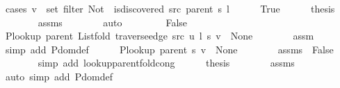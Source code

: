\begin{isabellebody}
\ {\isacharparenleft}{\kern0pt}cases\ {\isachardoublequoteopen}v\ {\isasymin}\ set\ {\isacharparenleft}{\kern0pt}filter\ {\isacharparenleft}{\kern0pt}Not\ {\isasymcirc}\ is{\isacharunderscore}{\kern0pt}discovered\ src\ {\isacharparenleft}{\kern0pt}parent\ s{\isacharparenright}{\kern0pt}{\isacharparenright}{\kern0pt}\ l{\isacharparenright}{\kern0pt}{\isachardoublequoteclose}{\isacharparenright}{\kern0pt}\isanewline
\ \ \ \ \isamarkupfalse%
\ True\isanewline
\ \ \ \ \isamarkupfalse%
\ {\isacharquery}{\kern0pt}thesis\isanewline
\ \ \ \ \ \ \isamarkupfalse%
\ assms{\isacharparenleft}{\kern0pt}{}{\isacharparenright}{\kern0pt}\isanewline
\ \ \ \ \ \ \isamarkupfalse%
\ auto\isanewline
\ \ \isamarkupfalse%
\isanewline
\ \ \ \ \isamarkupfalse%
\ False\isanewline
\ \ \ \ \isamarkupfalse%
\ {\isachardoublequoteopen}P{\isacharunderscore}{\kern0pt}lookup\ {\isacharparenleft}{\kern0pt}parent\ {\isacharparenleft}{\kern0pt}List{\isachardot}{\kern0pt}fold\ {\isacharparenleft}{\kern0pt}traverse{\isacharunderscore}{\kern0pt}edge\ src\ u{\isacharparenright}{\kern0pt}\ l\ s{\isacharparenright}{\kern0pt}{\isacharparenright}{\kern0pt}\ v\ {\isasymnoteq}\ None{\isachardoublequoteclose}\isanewline
\ \ \ \ \ \ \isamarkupfalse%
\ assm\isanewline
\ \ \ \ \ \ \isamarkupfalse%
\ {\isacharparenleft}{\kern0pt}simp\ add{\isacharcolon}{\kern0pt}\ P{\isachardot}{\kern0pt}dom{\isacharunderscore}{\kern0pt}def{\isacharparenright}{\kern0pt}\isanewline
\ \ \ \ \isamarkupfalse%
\ {\isachardoublequoteopen}P{\isacharunderscore}{\kern0pt}lookup\ {\isacharparenleft}{\kern0pt}parent\ s{\isacharparenright}{\kern0pt}\ v\ {\isasymnoteq}\ None{\isachardoublequoteclose}\isanewline
\ \ \ \ \ \ \isamarkupfalse%
\ assms{\isacharparenleft}{\kern0pt}{}{\isacharcomma}{\kern0pt}\ {}{\isacharparenright}{\kern0pt}\ False\isanewline
\ \ \ \ \ \ \isamarkupfalse%
\ {\isacharparenleft}{\kern0pt}simp\ add{\isacharcolon}{\kern0pt}\ lookup{\isacharunderscore}{\kern0pt}parent{\isacharunderscore}{\kern0pt}fold{\isacharunderscore}{\kern0pt}cong{\isacharparenright}{\kern0pt}\isanewline
\ \ \ \ \isamarkupfalse%
\ {\isacharquery}{\kern0pt}thesis\isanewline
\ \ \ \ \ \ \isamarkupfalse%
\ assms{\isacharparenleft}{\kern0pt}{}{\isacharparenright}{\kern0pt}\isanewline
\ \ \ \ \ \ \isamarkupfalse%
\ {\isacharparenleft}{\kern0pt}auto\ simp\ add{\isacharcolon}{\kern0pt}\ P{\isachardot}{\kern0pt}dom{\isacharunderscore}{\kern0pt}def{\isacharparenright}{\kern0pt}\isanewline

\end{isabellebody}
